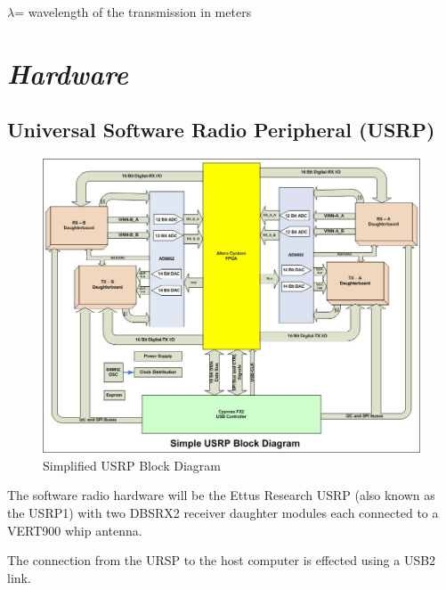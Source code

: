 \documentclass[a4paper]{report}
\newcommand\textstyleEmphasis[1]{\textit{#1}}
\numberwithin{equation}{chapter}
\begin{document}
 $\lambda$= wavelength of the transmission in meters

\section[Hardware]{\textstyleEmphasis{\textup{Hardware}}}
\subsection[Universal Software Radio Peripheral (USRP)]{Universal Software Radio Peripheral (USRP)}

\begin{figure}
\centering 
\includegraphics[scale=.6]{usrpblockdkmyg9.jpg}
\caption[Simplified USRP Block Diagram]{Simplified USRP Block Diagram}
\label{fig:usrpblock}
\end{figure}

The software radio hardware will be the Ettus Research USRP (also known as the USRP1) with two DBSRX2 receiver daughter modules each connected to a VERT900 whip antenna.

\bigskip

The connection from the URSP to the host computer is effected using a USB2 link.
\end{document}

